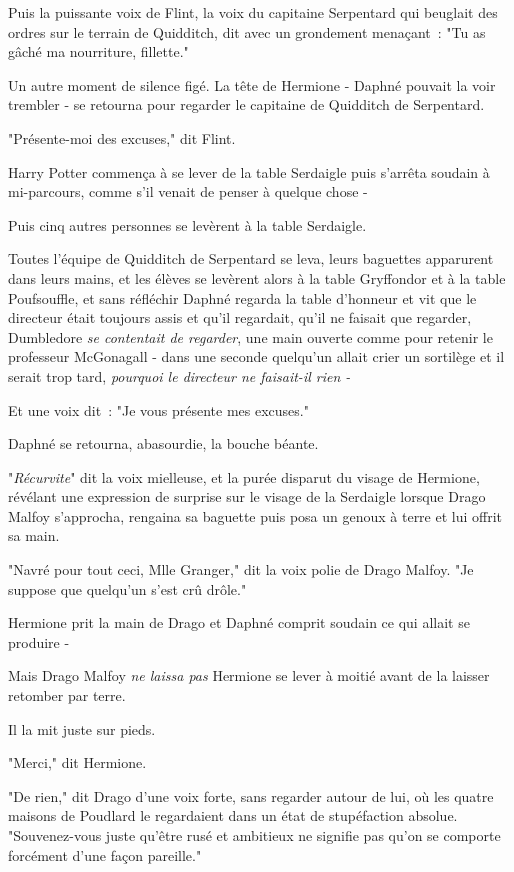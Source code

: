 Puis la puissante voix de Flint, la voix du capitaine Serpentard qui beuglait des ordres sur le terrain de Quidditch, dit avec un grondement menaçant~: "Tu as gâché ma nourriture, fillette."

Un autre moment de silence figé. La tête de Hermione - Daphné pouvait la voir trembler - se retourna pour regarder le capitaine de Quidditch de Serpentard.

"Présente-moi des excuses," dit Flint.

Harry Potter commença à se lever de la table Serdaigle puis s'arrêta soudain à mi-parcours, comme s'il venait de penser à quelque chose -

Puis cinq autres personnes se levèrent à la table Serdaigle.

Toutes l'équipe de Quidditch de Serpentard se leva, leurs baguettes apparurent dans leurs mains, et les élèves se levèrent alors à la table Gryffondor et à la table Poufsouffle, et sans réfléchir Daphné regarda la table d'honneur et vit que le directeur était toujours assis et qu'il regardait, qu'il ne faisait que regarder, Dumbledore \emph{se contentait de regarder}, une main ouverte comme pour retenir le professeur McGonagall - dans une seconde quelqu'un allait crier un sortilège et il serait trop tard, \emph{pourquoi le directeur ne faisait-il rien -}

Et une voix dit~: "Je vous présente mes excuses."

Daphné se retourna, abasourdie, la bouche béante.

"\emph{Récurvite}" dit la voix mielleuse, et la purée disparut du visage de Hermione, révélant une expression de surprise sur le visage de la Serdaigle lorsque Drago Malfoy s'approcha, rengaina sa baguette puis posa un genoux à terre et lui offrit sa main.

"Navré pour tout ceci, Mlle Granger," dit la voix polie de Drago Malfoy. "Je suppose que quelqu'un s'est crû drôle."

Hermione prit la main de Drago et Daphné comprit soudain ce qui allait se produire -

Mais Drago Malfoy \emph{ne laissa pas} Hermione se lever à moitié avant de la laisser retomber par terre.

Il la mit juste sur pieds.

"Merci," dit Hermione.

"De rien," dit Drago d'une voix forte, sans regarder autour de lui, où les quatre maisons de Poudlard le regardaient dans un état de stupéfaction absolue. "Souvenez-vous juste qu'être rusé et ambitieux ne signifie pas qu'on se comporte forcément d'une façon pareille."

